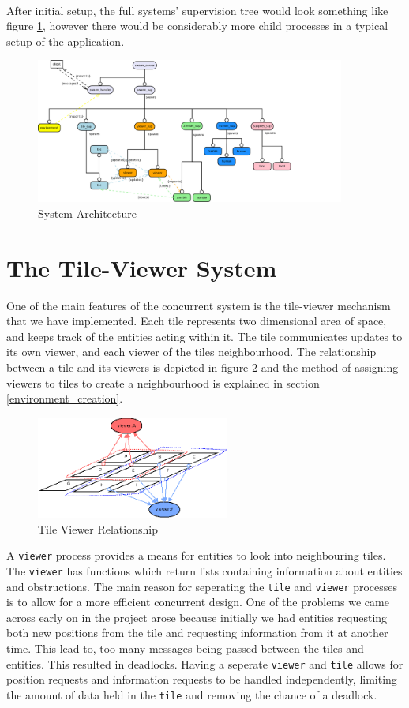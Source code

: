 \documentclass[10pt, a4paper, conference, compsocconf]{IEEEtran}
\begin{document}
\\
After initial setup, the full systems' supervision tree would look something like figure \ref{fig:system_ws}, however there would be considerably more child processes in a typical setup of the application.
\begin{figure}[h]
  \centering
  \includegraphics[width=4in]{../img/final_system_ws.png}
\caption{System Architecture}
    \label{fig:system_ws}
\end{figure}

\section{The Tile-Viewer System \label{tile_viewer}}
One of the main features of the concurrent system is the tile-viewer mechanism that we have implemented. Each tile represents two dimensional area of space, and keeps track of the entities acting within it. The tile communicates updates to its own viewer, and each viewer of the tiles neighbourhood. The relationship between a tile and its viewers is depicted in figure \ref{fig:tile_viewer_rel} and the method of assigning viewers to tiles to create a neighbourhood is explained in section \ref{environment_creation}.
\begin{figure}[h]
  \centering
  \includegraphics[width=2.5in]{../img/tile_to_viewer_map.png}
  \caption{Tile Viewer Relationship}
  \label{fig:tile_viewer_rel}
\end{figure}

A \verb+viewer+ process provides a means for entities to look into neighbouring tiles. The \verb+viewer+ has functions which return lists containing information about entities and obstructions. The main reason for seperating the \verb+tile+ and \verb+viewer+ processes is to allow for a more efficient concurrent design. One of the problems we came across early on in the project arose because initially we had entities requesting both new positions from the tile and requesting information from it at another time. This lead to, too many messages being passed between the tiles and entities. This resulted in deadlocks. Having a seperate \verb+viewer+ and \verb+tile+ allows for position requests and information requests to be handled independently, limiting the amount of data held in the \verb+tile+ and removing the chance of a deadlock.
\end{document}
